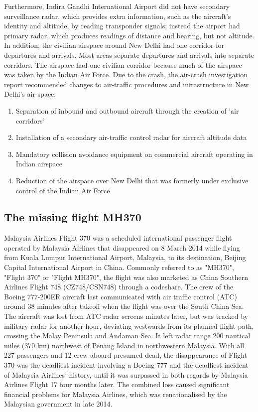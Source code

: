 \documentclass[a4paper,10pt]{article}
\begin{document}
Furthermore, Indira Gandhi International Airport did not have secondary surveillance radar, which provides extra information, such as the aircraft's identity and altitude, by reading transponder signals; instead the airport had primary radar, which produces readings of distance and bearing, but not altitude. In addition, the civilian airspace around New Delhi had one corridor for departures and arrivals. Most areas separate departures and arrivals into separate corridors. The airspace had one civilian corridor because much of the airspace was taken by the Indian Air Force. Due to the crash, the air-crash investigation report recommended changes to air-traffic procedures and infrastructure in New Delhi's air-space:
\begin{enumerate}
\item Separation of inbound and outbound aircraft through the creation of 'air corridors'
\item Installation of a secondary air-traffic control radar for aircraft altitude data
\item Mandatory collision avoidance equipment on commercial aircraft operating in Indian airspace
\item Reduction of the airspace over New Delhi that was formerly under exclusive control of the Indian Air Force
\end{enumerate}
\subsection{The missing flight MH370}
Malaysia Airlines Flight 370 was a scheduled international passenger flight operated by Malaysia Airlines that disappeared on 8 March 2014 while flying from Kuala Lumpur International Airport, Malaysia, to its destination, Beijing Capital International Airport in China. Commonly referred to as "MH370", "Flight 370" or "Flight MH370", the flight was also marketed as China Southern Airlines Flight 748 (CZ748/CSN748) through a codeshare. The crew of the Boeing 777-200ER aircraft last communicated with air traffic control (ATC) around 38 minutes after takeoff when the flight was over the South China Sea. The aircraft was lost from ATC radar screens minutes later, but was tracked by military radar for another hour, deviating westwards from its planned flight path, crossing the Malay Peninsula and Andaman Sea. It left radar range 200 nautical miles (370 km) northwest of Penang Island in northwestern Malaysia. With all 227 passengers and 12 crew aboard presumed dead, the disappearance of Flight 370 was the deadliest incident involving a Boeing 777 and the deadliest incident of Malaysia Airlines' history, until it was surpassed in both regards by Malaysia Airlines Flight 17 four months later. The combined loss caused significant financial problems for Malaysia Airlines, which was renationalised by the Malaysian government in late 2014.\par
\end{document}
